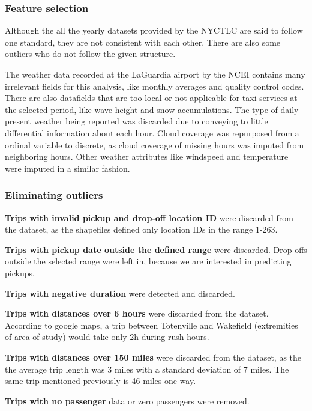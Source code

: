 \documentclass[11pt]{article}
\begin{document}
\subsubsection{Feature selection}

Although the all the yearly datasets provided by the NYCTLC are said to follow one standard, they are not consistent with each other. There are also some outliers who do not follow the given structure. 

The weather data recorded at the LaGuardia airport by the NCEI \cite{weatherDataGuide} contains many irrelevant fields for this analysis, like monthly averages and quality control codes. There are also datafields that are too local or not applicable for taxi services at the selected period, like wave height and snow accumulations. The type of daily present weather being reported was discarded due to conveying to little differential information about each hour. Cloud coverage was repurposed from a ordinal variable to discrete, as cloud coverage of missing hours was imputed from neighboring hours. Other weather attributes like windspeed and temperature were imputed in a similar fashion.

\subsubsection{Eliminating outliers}


\textbf{Trips with invalid pickup and drop-off location ID} were discarded from the dataset, as the shapefiles defined only location IDs in the range 1-263.

\textbf{Trips with pickup date outside the defined range} were discarded. Drop-offs outside the selected range were left in, because we are interested in predicting pickups.

\textbf{Trips with negative duration} were detected and discarded.

\textbf{Trips with distances over 6 hours} were discarded from the dataset. According to google maps, a trip between Totenville and Wakefield (extremities of area of study) would take only 2h during rush hours.

\textbf{Trips with distances over 150 miles} were discarded from the dataset, as the the average trip length was 3 miles with a standard deviation of 7 miles. The same trip mentioned previously is 46 miles one way.

\textbf{Trips with no passenger} data or zero passengers were removed.
\end{document}
